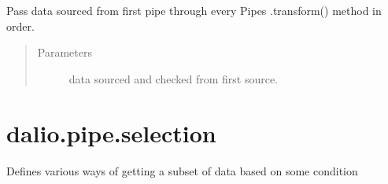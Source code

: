 \documentclass[letterpaper,10pt,english]{sphinxmanual}
\begin{document}
\begin{fulllineitems}
\begin{fulllineitems}
\end{fulllineitems}


\begin{fulllineitems}
\label{\detokenize{dalio.pipe:dalio.pipe.pipe.PipeLine.transform}}
Pass data sourced from first pipe through every Pipe\textasciigrave{}s
.transform() method in order.
\begin{quote}\begin{description}
\item[{Parameters}] \leavevmode
{} \textendash{} data sourced and checked from first source.

\end{description}\end{quote}

\end{fulllineitems}


\end{fulllineitems}



\section{dalio.pipe.selection}
\label{\detokenize{dalio.pipe:module-dalio.pipe.selection}}\label{\detokenize{dalio.pipe:dalio-pipe-selection}}
Defines various ways of getting a subset of data based on some condition
\end{document}
